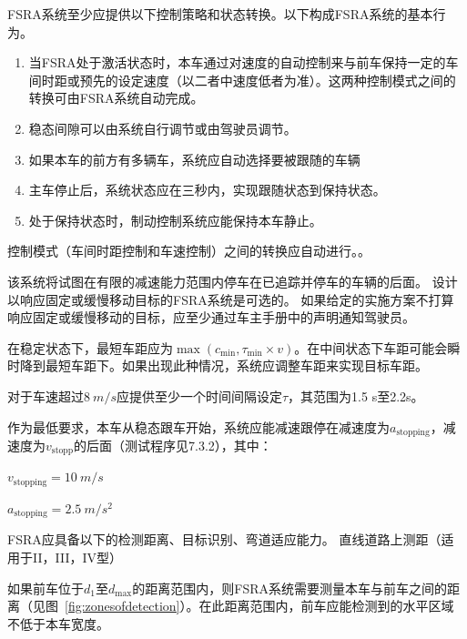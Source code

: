 \documentclass[is,copyright,is]{isov2}
\begin{document}
FSRA系统至少应提供以下控制策略和状态转换。以下构成FSRA系统的基本行为。

\begin{enumerate}
	\item 当FSRA处于激活状态时，本车通过对速度的自动控制来与前车保持一定的车间时距或预先的设定速度（以二者中速度低者为准）。这两种控制模式之间的转换可由FSRA系统自动完成。
	\item 稳态间隙可以由系统自行调节或由驾驶员调节。
	\item 如果本车的前方有多辆车，系统应自动选择要被跟随的车辆
	\item 主车停止后，系统状态应在三秒内，实现跟随状态到保持状态。
	\item 处于保持状态时，制动控制系统应能保持本车静止。
\end{enumerate}


控制模式（车间时距控制和车速控制）之间的转换应自动进行。。

该系统将试图在有限的减速能力范围内停车在已追踪并停车的车辆的后面。 设计以响应固定或缓慢移动目标的FSRA系统是可选的。 如果给定的实施方案不打算响应固定或缓慢移动的目标，应至少通过车主手册中的声明通知驾驶员。
\label{6.2.4}
\begin{symbols}
\end{symbols}

在稳定状态下，最短车距应为$\max(c_\text{min},\tau_\text{min}\times v)$。在中间状态下车距可能会瞬时降到最短车距下。如果出现此种情况，系统应调整车距来实现目标车距。


对于车速超过$\SI{8}{m/s}$应提供至少一个时间间隔设定$\tau$，其范围为1.5 s至2.2s。

作为最低要求，本车从稳态跟车开始，系统应能减速跟停在减速度为$a_\text{stopping}$，减速度为$v_\text{stopp}$的后面（测试程序见7.3.2），其中：

$v_\text{stopping} = \SI{10}{m/s}$

$a_\text{stopping}=\SI{2.5}{m/s^2}$

\sssclause{}
FSRA应具备以下的检测距离、目标识别、弯道适应能力。
\sssclause{}
直线道路上测距（适用于II，III，IV型）

如果前车位于$d_1$至$d_\text{max}$的距离范围内，则FSRA系统需要测量本车与前车之间的距离（见图~\ref{fig:zonesofdetection}）。在此距离范围内，前车应能检测到的水平区域不低于本车宽度。 
\end{document}
